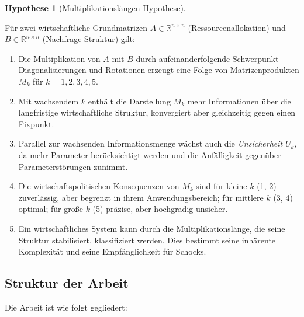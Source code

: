 \documentclass[a4paper,12pt]{article}
\theoremstyle{definition}
\newtheorem{hypothesis}{Hypothese}
\begin{document}
\begin{hypothesis}[Multiplikationslängen-Hypothese]
\label{hyp:zentral}

Für zwei wirtschaftliche Grundmatrizen $A \in \mathbb{R}^{n \times n}$ (Ressourcenallokation) und $B \in \mathbb{R}^{n \times n}$ (Nachfrage-Struktur) gilt:

\begin{enumerate}
\item Die Multiplikation von $A$ mit $B$ durch aufeinanderfolgende Schwerpunkt-Diagonalisierungen und Rotationen erzeugt eine Folge von Matrizenprodukten $M_k$ für $k = 1, 2, 3, 4, 5$.

\item Mit wachsendem $k$ enthält die Darstellung $M_k$ mehr Informationen über die langfristige wirtschaftliche Struktur, konvergiert aber gleichzeitig gegen einen Fixpunkt.

\item Parallel zur wachsenden Informationsmenge wächst auch die \emph{Unsicherheit} $U_k$, da mehr Parameter berücksichtigt werden und die Anfälligkeit gegenüber Parameterstörungen zunimmt.

\item Die wirtschaftspolitischen Konsequenzen von $M_k$ sind für kleine $k$ (1, 2) zuverlässig, aber begrenzt in ihrem Anwendungsbereich; für mittlere $k$ (3, 4) optimal; für große $k$ (5) präzise, aber hochgradig unsicher.

\item Ein wirtschaftliches System kann durch die Multiplikationslänge, die seine Struktur stabilisiert, klassifiziert werden. Dies bestimmt seine inhärente Komplexität und seine Empfänglichkeit für Schocks.
\end{enumerate}

\end{hypothesis}

\subsection{Struktur der Arbeit}

Die Arbeit ist wie folgt gegliedert:
\end{document}
